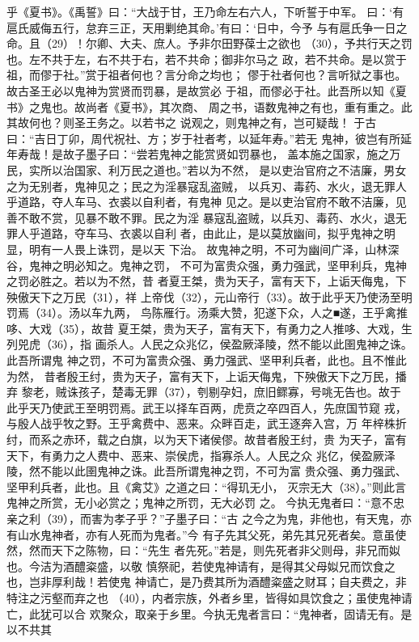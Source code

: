 \documentclass[12pt,UTF8]{ctexbook}
\begin{document}
乎《夏书》。《禹誓》曰：“大战于甘，王乃命左右六人，下听誓于中军。 
曰：‘有扈氏威侮五行，怠弃三正，天用剿绝其命。’有曰：‘日中，今予 
与有扈氏争一日之命。且（29）！尔卿、大夫、庶人。予非尔田野葆士之欲也 
（30），予共行天之罚也。左不共于左，右不共于右，若不共命；御非尔马之 
政，若不共命。是以赏于祖，而僇于社。”赏于祖者何也？言分命之均也； 
僇于社者何也？言听狱之事也。故古圣王必以鬼神为赏贤而罚暴，是故赏必 
于祖，而僇必于社。此吾所以知《夏书》之鬼也。故尚者《夏书》，其次商、 
周之书，语数鬼神之有也，重有重之。此其故何也？则圣王务之。以若书之 
说观之，则鬼神之有，岂可疑哉！ 
于古曰：“吉日丁卯，周代祝社、方；岁于社者考，以延年寿。”若无 
鬼神，彼岂有所延年寿哉！是故子墨子曰：“尝若鬼神之能赏贤如罚暴也， 
盖本施之国家，施之万民，实所以治国家、利万民之道也。”若以为不然， 
是以吏治官府之不洁廉，男女之为无别者，鬼神见之；民之为淫暴寇乱盗贼， 
以兵刃、毒药、水火，退无罪人乎道路，夺人车马、衣裘以自利者，有鬼神 
见之。是以吏治官府不敢不洁廉，见善不敢不赏，见暴不敢不罪。民之为淫 
暴寇乱盗贼，以兵刃、毒药、水火，退无罪人乎道路，夺车马、衣裘以自利 
者，由此止，是以莫放幽间，拟乎鬼神之明显，明有一人畏上诛罚，是以天 
下治。 
故鬼神之明，不可为幽间广泽，山林深谷，鬼神之明必知之。鬼神之罚， 
不可为富贵众强，勇力强武，坚甲利兵，鬼神之罚必胜之。若以为不然，昔 
者夏王桀，贵为天子，富有天下，上诟天侮鬼，下殃傲天下之万民（31），祥 
上帝伐（32），元山帝行（33）。故于此乎天乃使汤至明罚焉（34）。汤以车九两， 
鸟陈雁行。汤乘大赞，犯遂下众，人之■遂，王乎禽推哆、大戏（35），故昔 
夏王桀，贵为天子，富有天下，有勇力之人推哆、大戏，生列兕虎（36），指 
画杀人。人民之众兆亿，侯盈厥泽陵，然不能以此圉鬼神之诛。此吾所谓鬼 
神之罚，不可为富贵众强、勇力强武、坚甲利兵者，此也。且不惟此为然， 
昔者殷王纣，贵为天子，富有天下，上诟天侮鬼，下殃傲天下之万民，播弃 
黎老，贼诛孩子，楚毒无罪（37），刳剔孕妇，庶旧鳏寡，号咷无告也。故于 
此乎天乃使武王至明罚焉。武王以择车百两，虎贲之卒四百人，先庶国节窥 
戎，与殷人战乎牧之野。王乎禽费中、恶来。众畔百走，武王逐奔入宫，万 
年梓株折纣，而系之赤环，载之白旗，以为天下诸侯僇。故昔者殷王纣，贵 
为天子，富有天下，有勇力之人费中、恶来、崇侯虎，指寡杀人。人民之众 
兆亿，侯盈厥泽陵，然不能以此圉鬼神之诛。此吾所谓鬼神之罚，不可为富 
贵众强、勇力强武、坚甲利兵者，此也。且《禽艾》之道之曰：“得玑无小， 
灭宗无大（38）。”则此言鬼神之所赏，无小必赏之；鬼神之所罚，无大必罚 
之。 
今执无鬼者曰：“意不忠亲之利（39），而害为孝子乎？”子墨子曰：“古 
之今之为鬼，非他也，有天鬼，亦有山水鬼神者，亦有人死而为鬼者。”今 
有子先其父死，弟先其兄死者矣。意虽使然，然而天下之陈物，曰：“先生 
者先死。”若是，则先死者非父则母，非兄而姒也。今洁为酒醴粢盛，以敬 
慎祭祀，若使鬼神请有，是得其父母姒兄而饮食之也，岂非厚利哉！若使鬼 
神请亡，是乃费其所为酒醴粢盛之财耳；自夫费之，非特注之污壑而弃之也 
（40），内者宗族，外者乡里，皆得如具饮食之；虽使鬼神请亡，此犹可以合 
欢聚众，取亲于乡里。今执无鬼者言曰：“鬼神者，固请无有。是以不共其 
\end{document}
